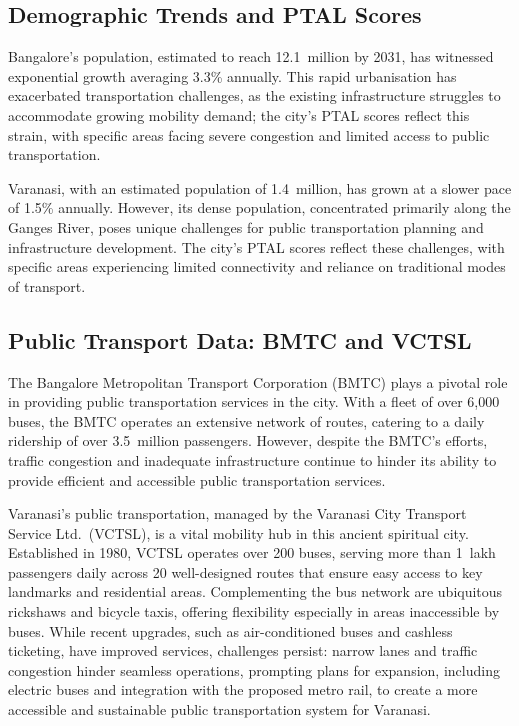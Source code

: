 \documentclass[11pt]{article}
\begin{document}
\subsection{Demographic Trends and PTAL Scores}

Bangalore's population, estimated to reach 12.1~million by 2031, has witnessed exponential
growth averaging 3.3\% annually. This rapid urbanisation has exacerbated transportation
challenges, as the existing infrastructure struggles to accommodate growing mobility demand; the
city's PTAL scores reflect this strain, with specific areas facing severe congestion and limited
access to public transportation.

Varanasi, with an estimated population of 1.4~million, has grown at a slower pace of 1.5\%
annually. However, its dense population, concentrated primarily along the Ganges River, poses
unique challenges for public transportation planning and infrastructure development. The city's
PTAL scores reflect these challenges, with specific areas experiencing limited connectivity and
reliance on traditional modes of transport.

\subsection{Public Transport Data: BMTC and VCTSL}

The Bangalore Metropolitan Transport Corporation (BMTC) plays a pivotal role in providing public
transportation services in the city. With a fleet of over 6,000 buses, the BMTC operates an
extensive network of routes, catering to a daily ridership of over 3.5~million passengers.
However, despite the BMTC's efforts, traffic congestion and inadequate infrastructure continue
to hinder its ability to provide efficient and accessible public transportation services.

Varanasi's public transportation, managed by the Varanasi City Transport Service Ltd.\ (VCTSL),
is a vital mobility hub in this ancient spiritual city. Established in 1980, VCTSL operates over
200 buses, serving more than 1~lakh passengers daily across 20 well-designed routes that ensure
easy access to key landmarks and residential areas. Complementing the bus network are ubiquitous
rickshaws and bicycle taxis, offering flexibility especially in areas inaccessible by buses.
While recent upgrades, such as air-conditioned buses and cashless ticketing, have improved services,
challenges persist: narrow lanes and traffic congestion hinder seamless operations, prompting
plans for expansion, including electric buses and integration with the proposed metro rail, to
create a more accessible and sustainable public transportation system for Varanasi.
\end{document}
